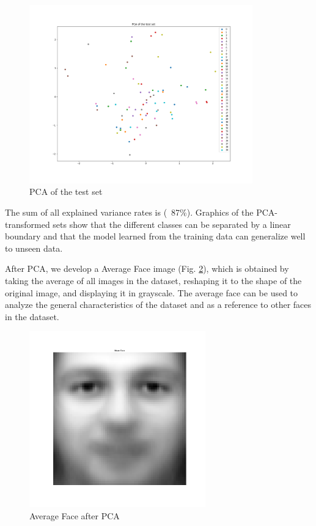 \documentclass[conference]{IEEEtran}
\begin{document}
\begin{figure}[!h]
    \centering
    \includegraphics[width=3.8in]{pca_of_the_test_set.png}
    \caption{PCA of the test set}
    \label{img:pca_of_the_test_set.png}
\end{figure}

The sum of all explained variance rates is (~87\%). Graphics of the PCA-transformed sets show that the different classes can be separated by a linear boundary and that the model learned from the training data can generalize well to unseen data.

After PCA, we develop a Average Face image (Fig. \ref{img:mean_face.png}), which is obtained by taking the average of all images in the dataset, reshaping it to the shape of the original image, and displaying it in grayscale. The average face can be used to analyze the general characteristics of the dataset and as a reference to other faces in the dataset.

\begin{figure}[!h]
    \centering
    \includegraphics[width=3.0in]{mean_face.png}
    \caption{Average Face after PCA}
    \label{img:mean_face.png}
\end{figure}
\end{document}
